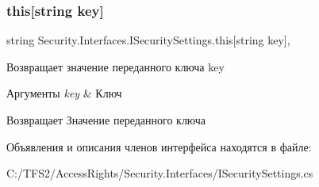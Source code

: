 \subsubsection{\texorpdfstring{this[string key]}{this[string key]}}
{\footnotesize\ttfamily string Security.\+Interfaces.\+I\+Security\+Settings.\+this\mbox{[}string key\mbox{]}\hspace{0.3cm}{\ttfamily [get]}, {\ttfamily [set]}}



Возвращает значение переданного ключа key 


\begin{DoxyParams}{Аргументы}
{\em key} & Ключ\\
\hline
\end{DoxyParams}
\begin{DoxyReturn}{Возвращает}
Значение переданного ключа
\end{DoxyReturn}


Объявления и описания членов интерфейса находятся в файле\+:\begin{DoxyCompactItemize}
\item 
C\+:/\+T\+F\+S2/\+Access\+Rights/\+Security.\+Interfaces/I\+Security\+Settings.\+cs\end{DoxyCompactItemize}
